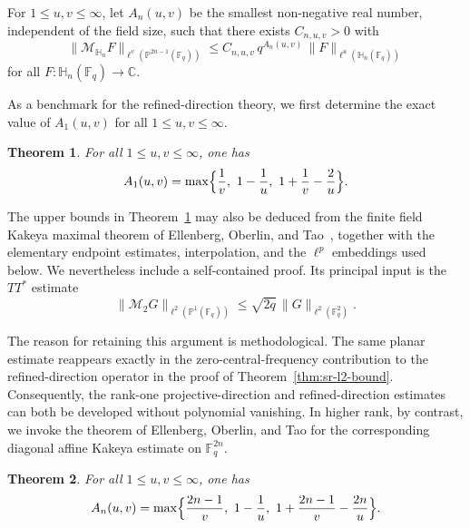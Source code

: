 \documentclass[11pt]{article}
\newtheorem{theorem}{Theorem}[section]
\newcommand{\1}{\mathbf 1}
\begin{document}
For $1\le u,v\le \infty$, let $A_n(u,v)$ be the smallest non-negative real number, independent of the field size, such that there
exists $C_{n,u,v}>0$ with
\begin{equation}\label{eq:An_def}
\|\mathcal{M}_{\mathbb{H}_n}F\|_{\ell^v(\mathbb{P}^{2n-1}(\mathbb{F}_q))}
\le
C_{n,u,v}\, q^{A_n(u,v)}\,
\|F\|_{\ell^u(\mathbb{H}_n(\mathbb{F}_q))}
\end{equation}
for all $F:\mathbb{H}_n(\mathbb{F}_q)\to\mathbb{C}$.

\medskip

{ 
As a benchmark for the refined-direction theory, we first determine the exact value of \(A_1(u,v)\) for all \(1\leq u,v\leq\infty\).}


\begin{theorem} \label{thm:exact_A}
For all $1\le u,v\le\infty$, one has
\begin{equation}\label{eq:A-max-formula}
A_1(u,v)
=
\max\Bigl\{\frac1v,\ 1-\frac1u,\ 1+\frac1v-\frac{2}{u}\Bigr\}.
\end{equation}
\end{theorem}


{  The upper bounds in Theorem~\ref{thm:exact_A} may also be
deduced from the finite field Kakeya maximal theorem of
Ellenberg, Oberlin, and Tao~\cite{EOT}, together with the
elementary endpoint estimates, interpolation, and the
$\ell^p$ embeddings used below. We nevertheless include a
self-contained proof. Its principal input is the
$TT^*$ estimate
\[
\|\mathcal M_2 G\|_{\ell^2(\mathbb P^1(\mathbb F_q))}
\le \sqrt{2q}\,\|G\|_{\ell^2(\mathbb F_q^2)}.
\]

The reason for retaining this argument is methodological.
The same planar estimate reappears exactly in the
zero-central-frequency contribution to the refined-direction
operator in the proof of Theorem~\ref{thm:sr-l2-bound}.
Consequently, the rank-one projective-direction and
refined-direction estimates can both be developed without
polynomial vanishing. In higher rank, by contrast, we invoke
the theorem of Ellenberg, Oberlin, and Tao for the corresponding
diagonal affine Kakeya estimate on $\mathbb F_q^{2n}$.}


\begin{theorem} \label{thm:exact_Hn}
For all $1\le u,v\le \infty$, one has
\begin{equation}\label{eq:An}
A_n(u,v)
=
\max\Bigl\{\frac{2n-1}{v},\ 1-\frac1u,\ 1+\frac{2n-1}{v}-\frac{2n}{u}\Bigr\}.
\end{equation}
\end{theorem}
\end{document}
